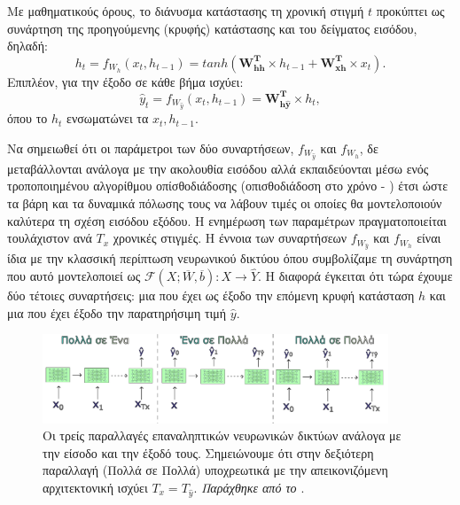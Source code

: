 Με μαθηματικούς όρους, το διάνυσμα κατάστασης τη χρονική στιγμή $t$ προκύπτει ως συνάρτηση της προηγούμενης (κρυφής) κατάστασης και του δείγματος εισόδου, δηλαδή:
\begin{equation}
  h_t = f_{W_{h}}(x_t, h_{t-1}) = tanh(\boldsymbol{W_{hh}^T}\times h_{t-1}+\boldsymbol{W_{xh}^T}\times x_t) .
\end{equation}
Επιπλέον, για την έξοδο σε κάθε βήμα ισχύει:
\begin{equation}
  \label{eq:ytrnn}
  \hat{y}_{t} = f_{W_{\hat{y}}}(x_t, h_{t-1}) = \boldsymbol{W_{h\hat{y}}^T}\times h_t,
\end{equation} όπου το $h_t$ ενσωματώνει τα $x_t, h_{t-1}$.\par

Να σημειωθεί ότι οι παράμετροι των δύο συναρτήσεων, $f_{W_{\hat{y}}}$ και $f_{W_{h}}$, δε μεταβάλλονται ανάλογα με την ακολουθία εισόδου αλλά εκπαιδεύονται μέσω ενός τροποποιημένου αλγορίθμου οπίσθοδιάδοσης (οπισθοδιάδοση στο χρόνο - ) έτσι ώστε τα βάρη και τα δυναμικά πόλωσης τους να λάβουν τιμές οι οποίες θα μοντελοποιούν καλύτερα τη σχέση εισόδου εξόδου. Η ενημέρωση των παραμέτρων πραγματοποιείται τουλάχιστον ανά $T_x$ χρονικές στιγμές. Η έννοια των συναρτήσεων $f_{W_{\hat{y}}}$ και $f_{W_{h}}$ είναι ίδια με την κλασσική περίπτωση νευρωνικού δικτύου όπου συμβολίζαμε τη συνάρτηση που αυτό μοντελοποιεί ως $\mathcal{F}(X;\overline{W},\overline{b}):X \rightarrow \hat{Y}$. Η διαφορά έγκειται ότι τώρα έχουμε δύο τέτοιες συναρτήσεις: μια που έχει ως έξοδο την επόμενη κρυφή κατάσταση $h$ και μια που έχει έξοδο την παρατηρήσιμη τιμή $\hat{y}$.\par

\begin{figure}[h]
  \centering
  \includegraphics[width=0.92\textwidth]{images/chapter theoritical background/rnn_types_gr.pdf}
  \caption{Οι τρείς παραλλαγές επαναληπτικών νευρωνικών δικτύων ανάλογα με την είσοδο και την έξοδό τους. Σημειώνουμε ότι στην δεξιότερη παραλλαγή (Πολλά σε Πολλά) υποχρεωτικά με την απεικονιζόμενη αρχιτεκτονική ισχύει $T_x = T_{\hat{y}}$. \textit{Παράχθηκε από το \href{https://inkscape.org/}{}}.}
  \label{fig:rnn_types}
\end{figure}

